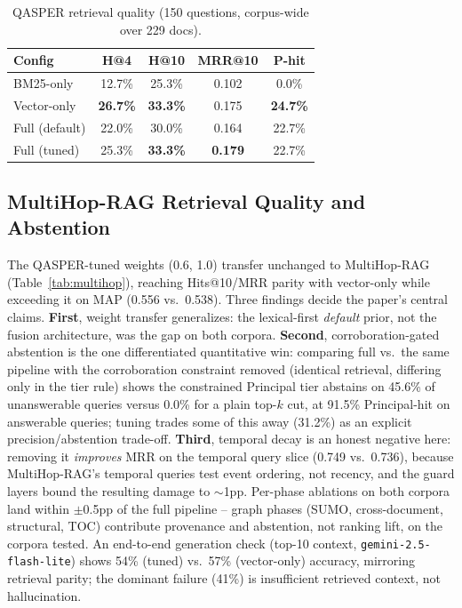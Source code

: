 \documentclass[conference,a4paper]{IEEEtran}
\begin{document}
\begin{table}[t]
\centering
\caption{QASPER retrieval quality (150 questions, corpus-wide over 229 docs).}
\label{tab:qasper}
\scriptsize
\setlength{\tabcolsep}{3pt}
\begin{tabular}{lcccc}
\toprule
Config & H@4 & H@10 & MRR@10 & P-hit \\
\midrule
BM25-only & 12.7\% & 25.3\% & 0.102 & 0.0\% \\
Vector-only & \textbf{26.7\%} & \textbf{33.3\%} & 0.175 & \textbf{24.7\%} \\
Full (default) & 22.0\% & 30.0\% & 0.164 & 22.7\% \\
Full (tuned) & 25.3\% & \textbf{33.3\%} & \textbf{0.179} & 22.7\% \\
\bottomrule
\end{tabular}
\end{table}

\subsection{MultiHop-RAG Retrieval Quality and Abstention}

The QASPER-tuned weights (0.6, 1.0) transfer unchanged to MultiHop-RAG (Table~\ref{tab:multihop}), reaching Hits@10/MRR parity with vector-only while exceeding it on MAP (0.556 vs.\ 0.538). Three findings decide the paper's central claims. \textbf{First}, weight transfer generalizes: the lexical-first \emph{default} prior, not the fusion architecture, was the gap on both corpora. \textbf{Second}, corroboration-gated abstention is the one differentiated quantitative win: comparing full vs.\ the same pipeline with the corroboration constraint removed (identical retrieval, differing only in the tier rule) shows the constrained Principal tier abstains on 45.6\% of unanswerable queries versus 0.0\% for a plain top-$k$ cut, at 91.5\% Principal-hit on answerable queries; tuning trades some of this away (31.2\%) as an explicit precision/abstention trade-off. \textbf{Third}, temporal decay is an honest negative here: removing it \emph{improves} MRR on the temporal query slice (0.749 vs.\ 0.736), because MultiHop-RAG's temporal queries test event ordering, not recency, and the guard layers bound the resulting damage to $\sim$1pp. Per-phase ablations on both corpora land within $\pm$0.5pp of the full pipeline -- graph phases (SUMO, cross-document, structural, TOC) contribute provenance and abstention, not ranking lift, on the corpora tested. An end-to-end generation check (top-10 context, \texttt{gemini-2.5-flash-lite}) shows 54\% (tuned) vs.\ 57\% (vector-only) accuracy, mirroring retrieval parity; the dominant failure (41\%) is insufficient retrieved context, not hallucination.
\end{document}
